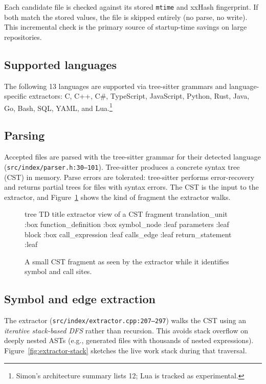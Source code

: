 Each candidate file is checked against its stored \texttt{mtime} and xxHash
fingerprint. If both match the stored values, the file is skipped entirely
(no parse, no write). This incremental check is the primary source of
startup-time savings on large repositories.

\subsection{Supported languages}

The following 13 languages are supported via tree-sitter grammars and
language-specific extractors: C, C++, C\#, TypeScript, JavaScript, Python,
Rust, Java, Go, Bash, SQL, YAML, and Lua.\footnote{Simon's architecture
summary lists 12; Lua is tracked as experimental.}

\subsection{Parsing}

Accepted files are parsed with the tree-sitter grammar for their detected
language (\texttt{src/index/parser.h:30--101}). Tree-sitter produces a
concrete syntax tree (CST) in memory. Parse errors are tolerated:
tree-sitter performs error-recovery and returns partial trees for files with
syntax errors. The CST is the input to the extractor, and
Figure~\ref{fig:cst-fragment} shows the kind of fragment the extractor walks.

\begin{figure}[htbp]
  \centering
\begin{triton}
tree TD
  title extractor view of a CST fragment
  translation_unit :box
    function_definition :box
      symbol_node :leaf
      parameters :leaf
      block :box
        call_expression :leaf
          calls_edge :leaf
        return_statement :leaf
\end{triton}
  \caption{A small CST fragment as seen by the extractor while it identifies
           symbol and call sites.}
  \label{fig:cst-fragment}
\end{figure}

\subsection{Symbol and edge extraction}

The extractor (\texttt{src/index/extractor.cpp:207--297}) walks the CST using
an \emph{iterative stack-based DFS} rather than recursion. This avoids stack
overflow on deeply nested ASTs (e.g., generated files with thousands of nested
expressions). Figure~\ref{fig:extractor-stack} sketches the live work stack
during that traversal.

